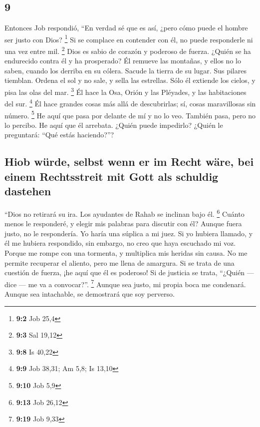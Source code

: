 \begin{paracol}{2}
\hypertarget{section-16}{%
\section{9}\label{section-16}}

 Entonces Job respondió,  ``En verdad sé que
es así, ¿pero cómo puede el hombre ser justo con Dios? \footnote{\textbf{9:2}
  Job 25,4}  Si se complace en contender con él, no puede
responderle ni una vez entre mil. \footnote{\textbf{9:3} Sal 19,12}
 Dios es sabio de corazón y poderoso de fuerza. ¿Quién se
ha endurecido contra él y ha prosperado?  Él remueve las
montañas, y ellos no lo saben, cuando los derriba en su cólera.
 Sacude la tierra de su lugar. Sus pilares tiemblan.
 Ordena el sol y no sale, y sella las estrellas.
 Sólo él extiende los cielos, y pisa las olas del mar.
\footnote{\textbf{9:8} Is 40,22}  Él hace la Osa, Orión y
las Pléyades, y las habitaciones del sur. \footnote{\textbf{9:9} Job
  38,31; Am 5,8; Is 13,10}  Él hace grandes cosas más
allá de descubrirlas; sí, cosas maravillosas sin número. \footnote{\textbf{9:10}
  Job 5,9}  He aquí que pasa por delante de mí y no lo
veo. También pasa, pero no lo percibo.  He aquí que él
arrebata. ¿Quién puede impedirlo? ¿Quién le preguntará: ``Qué estás
haciendo?''?

\hypertarget{hiob-wuxfcrde-selbst-wenn-er-im-recht-wuxe4re-bei-einem-rechtsstreit-mit-gott-als-schuldig-dastehen}{%
\subsection{Hiob würde, selbst wenn er im Recht wäre, bei einem
Rechtsstreit mit Gott als schuldig
dastehen}\label{hiob-wuxfcrde-selbst-wenn-er-im-recht-wuxe4re-bei-einem-rechtsstreit-mit-gott-als-schuldig-dastehen}}

 ``Dios no retirará su ira. Los ayudantes de Rahab se
inclinan bajo él. \footnote{\textbf{9:13} Job 26,12} 
Cuánto menos le responderé, y elegir mis palabras para discutir con él?
 Aunque fuera justo, no le respondería. Yo haría una
súplica a mi juez.  Si yo hubiera llamado, y él me
hubiera respondido, sin embargo, no creo que haya escuchado mi voz.
 Porque me rompe con una tormenta, y multiplica mis
heridas sin causa.  No me permite recuperar el aliento,
pero me llena de amargura.  Si se trata de una cuestión
de fuerza, ¡he aquí que él es poderoso! Si de justicia se trata,
``¿Quién --- dice --- me va a convocar?''. \footnote{\textbf{9:19} Job
  9,33}  Aunque sea justo, mi propia boca me condenará.
Aunque sea intachable, se demostrará que soy perverso.


\end{paracol}
